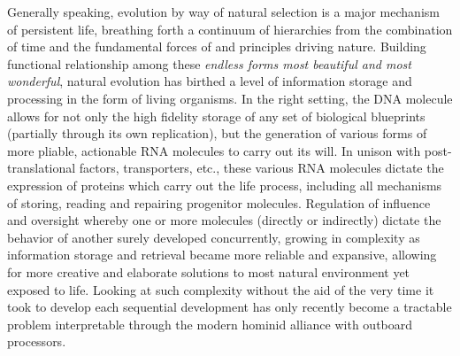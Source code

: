 Generally speaking, evolution by way of natural selection is a major mechanism of persistent life, breathing forth a continuum of hierarchies from the combination of time and the fundamental forces of and principles driving nature. Building functional relationship among these \emph{endless forms most beautiful and most wonderful}\citep{darwin1869origin}, natural evolution has birthed a level of information storage and processing in the form of living organisms. In the right setting, the DNA molecule allows for not only the high fidelity storage of any set of biological blueprints (partially through its own replication), but the generation of various forms of more pliable, actionable RNA molecules to carry out its will. In unison with post-translational factors, transporters, etc., these various RNA molecules dictate the expression of proteins which carry out the life process, including all mechanisms of storing, reading and repairing progenitor molecules. Regulation of influence and oversight whereby one or more molecules (directly or indirectly) dictate the behavior of another surely developed concurrently, growing in complexity as information storage and retrieval became more reliable and expansive, allowing for more creative and elaborate solutions to most natural environment yet exposed to life. Looking at such complexity without the aid of the very time it took to develop each sequential development has only recently become a tractable problem interpretable through the modern hominid alliance with outboard processors.

